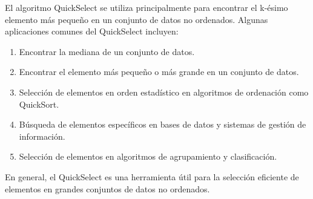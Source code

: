 El algoritmo QuickSelect se utiliza principalmente para encontrar el k-ésimo elemento más pequeño en un conjunto de datos no ordenados. Algunas aplicaciones comunes del QuickSelect incluyen:

\begin{enumerate}
	\item Encontrar la mediana de un conjunto de datos.
	\item Encontrar el elemento más pequeño o más grande en un conjunto de datos.
	\item Selección de elementos en orden estadístico en algoritmos de ordenación como QuickSort.
	\item Búsqueda de elementos específicos en bases de datos y sistemas de gestión de información.
	\item Selección de elementos en algoritmos de agrupamiento y clasificación.
\end{enumerate}
 
En general, el QuickSelect es una herramienta útil para la selección eficiente de elementos en grandes conjuntos de datos no ordenados.
